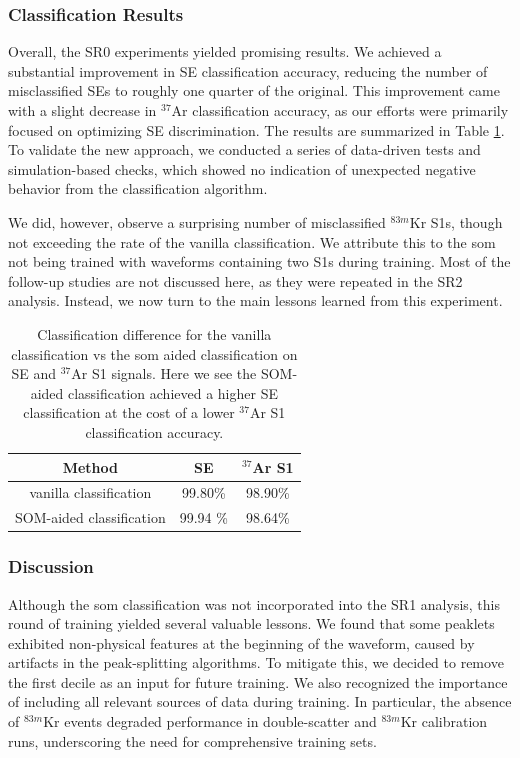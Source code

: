 \subsubsection*{Classification Results}

Overall, the SR0 experiments yielded promising results. We achieved a substantial improvement in SE classification accuracy, reducing the number of misclassified SEs to roughly one quarter of the original. This improvement came with a slight decrease in $^{37}$Ar classification accuracy, as our efforts were primarily focused on optimizing SE discrimination. The results are summarized in Table \ref{peaklet_results_sr0}. To validate the new approach, we conducted a series of data-driven tests and simulation-based checks, which showed no indication of unexpected negative behavior from the classification algorithm.

We did, however, observe a surprising number of misclassified $^{83m}$Kr S1s, though not exceeding the rate of the vanilla classification. We attribute this to the \acrshort{som} not being trained with waveforms containing two S1s during training. Most of the follow-up studies are not discussed here, as they were repeated in the SR2 analysis. Instead, we now turn to the main lessons learned from this experiment.

\begin{table}[]
    \centering
    \begin{tabular}{|c|c|c|}
    \hline
         Method & SE &  $^{37}$Ar S1 \\
         \hline
         vanilla classification & 99.80\% & 98.90\% \\
         SOM-aided classification & 99.94 \% & 98.64\% \\
         \hline
    \end{tabular}
    \caption{Classification difference for the vanilla classification vs the \acrshort{som} aided classification on SE and $^{37}$Ar S1 signals. Here we see the SOM-aided classification achieved a higher SE classification at the cost of a lower $^{37}$Ar S1 classification accuracy.}
    \label{peaklet_results_sr0}
\end{table}

\subsubsection*{Discussion}

Although the \acrshort{som} classification was not incorporated into the SR1 analysis, this round of training yielded several valuable lessons. We found that some peaklets exhibited non-physical features at the beginning of the waveform, caused by artifacts in the peak-splitting algorithms. To mitigate this, we decided to remove the first decile as an input for future training. We also recognized the importance of including all relevant sources of data during training. In particular, the absence of $^{83m}$Kr events degraded performance in double-scatter and $^{83m}$Kr calibration runs, underscoring the need for comprehensive training sets. 

